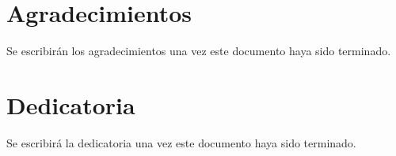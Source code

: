 \chapter*{Agradecimientos}

Se escribirán los agradecimientos una vez este documento haya sido terminado.

\newpage

\chapter*{Dedicatoria}

Se escribirá la dedicatoria una vez este documento haya sido terminado.